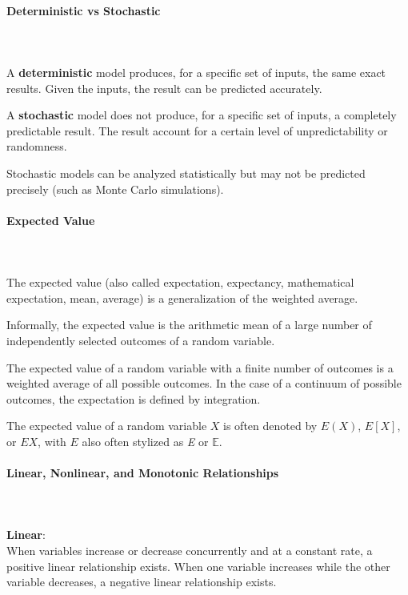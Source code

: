 \documentclass{article}
\begin{document}
\paragraph{Deterministic vs Stochastic}\mbox{} \\ 
\mbox{} \\
A \textbf{deterministic} model produces, for a specific set of inputs, the same exact results. Given the inputs, the result can be predicted accurately.

A \textbf{stochastic} model does not produce, for a specific set of inputs, a completely predictable result. The result account for a certain level of unpredictability or randomness. 

Stochastic models can be analyzed statistically but may not be predicted precisely (such as Monte Carlo simulations).

\paragraph{Expected Value}\mbox{} \\ 
\mbox{} \\
The expected value (also called expectation, expectancy, mathematical expectation, mean, average) is a generalization of the weighted average. 

Informally, the expected value is the arithmetic mean of a large number of independently selected outcomes of a random variable.

The expected value of a random variable with a finite number of outcomes is a weighted average of all possible outcomes. In the case of a continuum of possible outcomes, the expectation is defined by integration.

The expected value of a random variable $X$ is often denoted by $E(X)$, $E[X]$, or $EX$, with $E$ also often stylized as \emph{E} or $\mathbb{E}$. 

\paragraph{Linear, Nonlinear, and Monotonic Relationships}\mbox{} \\ 
\mbox{} \\

\textbf{Linear}: \\ 
When variables increase or decrease concurrently and at a constant rate, a positive linear relationship exists.
When one variable increases while the other variable decreases, a negative linear relationship exists.
\end{document}
